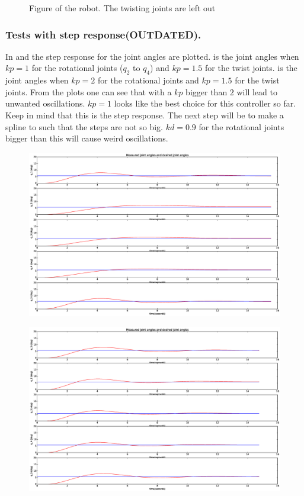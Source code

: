 \begin{figure}[htbp]
    \centering
    
    \caption{Figure of the robot. The twisting joints are left out}
    \label{draw:pot-rob}
\end{figure}


\subsubsection{Tests with step response(OUTDATED).}
In  and  the step response for the joint angles are plotted.  is the joint angles when $kp = 1$ for the rotational joints ($q_2$ to $q_4$) and $kp = 1.5$ for the twist joints.   is the joint angles when $kp = 2$ for the rotational joints and $kp = 1.5$ for the twist joints. From the plots one can see that with a $kp$ bigger than $2$ will lead to unwanted oscillations. $kp = 1$ looks like the best choice for this controller so far. Keep in mind that this is the step response. The next step will be to make a spline to such that the steps are not so big. $kd = 0.9$ for the rotational joints bigger than this will cause weird oscillations.

\begin{figure}[htbp]
  \centering
  \includegraphics[width=.9\textwidth]{img/joingangKp1.eps}
  \caption{}
  \label{fig:testkp1}
\end{figure}
\begin{figure}[htbp]
  \centering
  \includegraphics[width=.9\textwidth]{img/joingangKp2.eps}
  \caption{}
  \label{fig:testkp2}
\end{figure}

